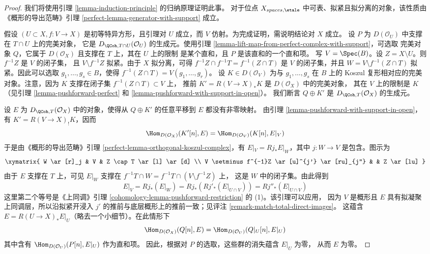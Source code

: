 \begin{proof}
我们将使用引理 \ref{lemma-induction-principle} 的归纳原理证明此事。
对于位点 $X_{spaces, \etale}$ 中可表、拟紧且拟分离的对象，该性质由
《概形的导出范畴》引理
\ref{perfect-lemma-generator-with-support} 成立。

\medskip\noindent
假设 $(U \subset X, f : V \to X)$ 是初等特异方形，且引理对 $U$
成立，而 $V$ 仿射。为完成证明，需说明结论对 $X$ 成立。
设 $P$ 为 $D(\mathcal{O}_U)$ 中支撑在 $T \cap U$ 上的完美对象，
它是 $D_{\QCoh, T \cap U}(\mathcal{O}_U)$ 的生成元。使用引理
\ref{lemma-lift-map-from-perfect-complex-with-support}，可选取
完美对象 $Q$，它属于 $D(\mathcal{O}_X)$ 且支撑在 $T$ 上，其在 $U$ 上的限制
是某个直和，且 $P$ 是该直和的一个直和项。
写 $V = \Spec(B)$。设 $Z = X \setminus U$。则 $f^{-1}Z$ 是 $V$ 的闭子集，
且 $V \setminus f^{-1}Z$ 拟紧。由于 $X$ 拟分离，可得
$f^{-1}Z \cap f^{-1}T = f^{-1}(Z \cap T)$ 是 $V$ 的闭子集，并且
$W = V \setminus f^{-1}(Z \cap T)$ 拟紧。因此可以选取
$g_1, \ldots, g_s \in B$，使得
$f^{-1}(Z \cap T) = V(g_1, \ldots, g_r)$。%
设 $K \in D(\mathcal{O}_V)$ 为与 $g_1, \ldots, g_s$ 在 $B$ 上的
Koszul 复形相对应的完美对象。注意，因为 $K$ 支撑在闭子集
$f^{-1}(Z \cap T) \subset V$ 上，%
推前
$K' = R(V \to X)_*K$ 是 $D(\mathcal{O}_X)$ 中的完美对象，
其在 $V$ 上的限制是 $K$（见引理 \ref{lemma-pushforward-perfect} 和
\ref{lemma-pushforward-with-support-in-open}）。
我们断言 $Q \oplus K'$ 是 $D_{\QCoh, T}(\mathcal{O}_X)$ 的生成元。

\medskip\noindent
设 $E$ 为 $D_{\QCoh, T}(\mathcal{O}_X)$ 中的对象，使得从
$Q \oplus K'$ 的任意平移到 $E$ 都没有非零映射。
由引理 \ref{lemma-pushforward-with-support-in-open}，有
$K' =  R(V \to X)_! K$，因而
$$
\Hom_{D(\mathcal{O}_X)}(K'[n], E) = \Hom_{D(\mathcal{O}_V)}(K[n], E|_V)
$$
于是由《概形的导出范畴》引理
\ref{perfect-lemma-orthogonal-koszul-complex}，有
$E|_V = Rj_*E|_W$，其中 $j : W \to V$ 是包含。图示为
$$
\xymatrix{
W \ar[r]_j & V & Z \cap T \ar[l] \ar[d] \\
V \setminus f^{-1}Z \ar[u]^{j'} \ar[ru]_{j''} & & Z \ar[lu]
}
$$
由于 $E$ 支撑在 $T$ 上，可见 $E|_W$ 支撑在
$f^{-1}T \cap W = f^{-1}T \cap (V \setminus f^{-1}Z)$ 上，
这是 $W$ 中的闭子集。由此得到
$$
E|_V = Rj_*(E|_W) = Rj_*(Rj'_*(E|_{U \cap V})) = Rj''_*(E|_{U \cap V})
$$
这里第二个等号是《上同调》引理
\ref{cohomology-lemma-pushforward-restriction} 的 (1)。该引理可以应用，
因为 $V$ 是概形且 $E$ 具有拟凝聚上同调层，所以沿拟紧开浸入 $j'$
的推前与底层概形上的推前一致；见评注
\ref{remark-match-total-direct-images}。
这蕴含 $E = R(U \to X)_*E|_U$（略去一个小细节）。在此情形下
$$
\Hom_{D(\mathcal{O}_X)}(Q[n], E) = \Hom_{D(\mathcal{O}_U)}(Q|_U[n], E|_U)
$$
其中含有 $\Hom_{D(\mathcal{O}_U)}(P[n], E|_U)$ 作为直和项。
因此，根据对 $P$ 的选取，这些群的消失蕴含 $E|_U$ 为零，
从而 $E$ 为零。
\end{proof}

